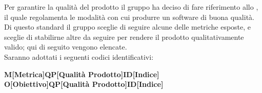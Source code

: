 \documentclass[../piano_di_qualifica.tex]{subfiles}
\begin{document}
Per garantire la qualità del prodotto il gruppo ha deciso di fare riferimento allo , il quale regolamenta le modalità con cui produrre un software di buona qualità. Di questo standard il gruppo sceglie di seguire alcune delle metriche esposte, e sceglie di stabilirne altre da seguire per rendere il prodotto qualitativamente valido; qui di seguito vengono elencate. \\
Saranno adottati i seguenti codici identificativi:\par

\begin{center}
	\textbf{M[Metrica]QP[Qualità Prodotto]ID[Indice]} \\
	\textbf{O[Obiettivo]QP[Qualità Prodotto]ID[Indice]}
\end{center}
\end{document}
